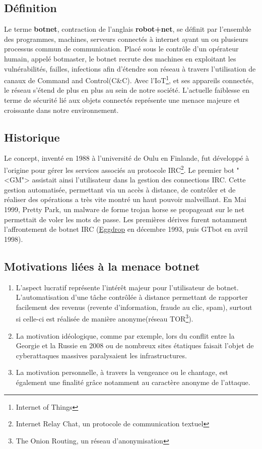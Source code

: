 \subsection{Définition}
\par
Le terme \textbf{botnet}, contraction de l'anglais \textbf{robot+net}, se définit par l'ensemble des programmes, machines, serveurs connectés à internet ayant un ou plusieurs processus commun de communication.
Placé sous le contrôle d'un opérateur humain, appelé botmaster, le botnet recrute des machines en exploitant les vulnérabilités, failles, infections afin d'étendre son réseau à travers l'utilisation de canaux de Command and Control(C\&C).
\newline Avec l'IoT\footnote{Internet of Things}, et ses appareils connectés, le réseau s'étend de plus en plus au sein de notre société. L'actuelle faiblesse en terme de sécurité lié aux objets connectés représente une menace majeure et croissante dans notre environnement.
\subsection{Historique}
\par
Le concept, inventé en 1988 à l'université de Oulu en Finlande, fut développé à l'origine pour gérer les services associés au protocole IRC\footnote{Internet Relay Chat, un protocole de communication textuel}.
\newline
Le premier bot "<GM"> assistait ainsi l'utilisateur dans la gestion des connections IRC.
Cette gestion automatisée, permettant via un accès à distance, de contrôler et de réaliser des opérations a très vite montré un haut pouvoir malveillant.
\newline
En Mai 1999, Pretty Park, un malware de forme trojan horse se propageant sur le net permettait de voler les mots de passe.
\newline
Les premières dérives furent notamment l'affrontement de botnet IRC (\href{https://www.eggheads.org/}{Eggdrop} en décembre 1993, puis GTbot en avril 1998).
\subsection{Motivations liées à la menace botnet}
\begin{enumerate}
	\item L'aspect lucratif représente l'intérêt majeur pour l'utilisateur de botnet. L'automatisation d'une tâche contrôlée à distance permettant de rapporter facilement des revenus (revente d'information, fraude au clic, spam), surtout si celle-ci est réalisée de manière anonyme(réseau TOR\footnote{The Onion Routing, un réseau d'anonymisation}).
	\item La motivation idéologique, comme par exemple, lors du conflit entre la Georgie et la Russie en 2008 ou de nombreux sites étatiques faisait l'objet de cyberattaques massives paralysaient les infrastructures.
	\item La motivation personnelle, à travers la vengeance ou le chantage, est également une finalité grâce notamment au caractère anonyme de l'attaque.
\end{enumerate}